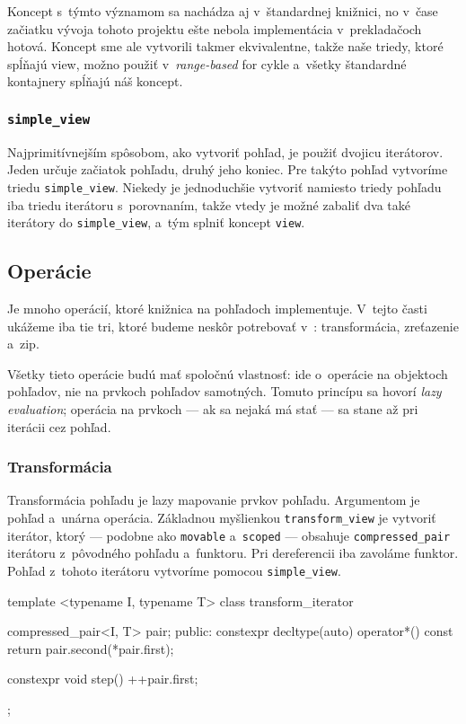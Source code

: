 Koncept s~týmto významom sa nachádza aj v~štandardnej knižnici, no v~čase začiatku vývoja tohoto projektu ešte nebola implementácia v~prekladačoch hotová. Koncept sme ale vytvorili takmer ekvivalentne, takže naše triedy, ktoré spĺňajú view, možno použiť v~\emph{range-based} for cykle a~všetky štandardné kontajnery spĺňajú náš koncept.

\subsubsection{\texttt{simple\_view}}

Najprimitívnejším spôsobom, ako vytvoriť pohľad, je použiť dvojicu iterátorov. Jeden určuje začiatok pohľadu, druhý jeho koniec. Pre takýto pohľad vytvoríme triedu \texttt{simple\_view}. Niekedy je jednoduchšie vytvoriť namiesto triedy pohľadu iba triedu iterátoru s~porovnaním, takže vtedy je možné zabaliť dva také iterátory do \texttt{simple\_view}, a~tým splniť koncept \texttt{view}.

\subsection{Operácie}

Je mnoho operácií, ktoré knižnica \PP{} na pohľadoch implementuje. V~tejto časti ukážeme iba tie tri, ktoré budeme neskôr potrebovať v~\PPreflection{}: transformácia, zreťazenie a~zip.

Všetky tieto operácie budú mať spoločnú vlastnosť: ide o~operácie na objektoch pohľadov, nie na prvkoch pohľadov samotných. Tomuto princípu sa hovorí \emph{lazy evaluation}; operácia na prvkoch --- ak sa nejaká má stať --- sa stane až pri iterácii cez pohľad.

\subsubsection{Transformácia}

Transformácia pohľadu je lazy mapovanie prvkov pohľadu. Argumentom je pohľad a~unárna operácia. Základnou myšlienkou \texttt{transform\_view} je vytvoriť iterátor, ktorý --- podobne ako \texttt{movable} a~\texttt{scoped} --- obsahuje \texttt{compressed\_pair} iterátoru z~pôvodného pohľadu a~funktoru. Pri dereferencii iba zavoláme funktor. Pohľad z~tohoto iterátoru vytvoríme pomocou \texttt{simple\_view}.

\begin{code}
template <typename I, typename T>
class transform_iterator
{   compressed_pair<I, T> pair;
public:
    constexpr decltype(auto) operator*() const
    { return pair.second(*pair.first); }

    constexpr void step() { ++pair.first; } };
\end{code}

